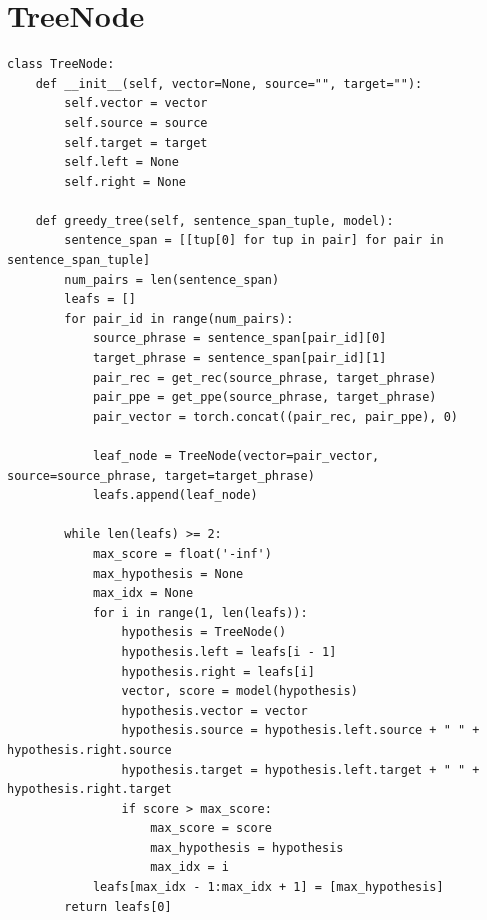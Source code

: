 \documentclass[12pt,a4paper,twoside,openright]{report}
\begin{document}
\section{TreeNode}
\begin{lstlisting}
class TreeNode:
    def __init__(self, vector=None, source="", target=""):
        self.vector = vector
        self.source = source
        self.target = target
        self.left = None
        self.right = None

    def greedy_tree(self, sentence_span_tuple, model):
        sentence_span = [[tup[0] for tup in pair] for pair in sentence_span_tuple]
        num_pairs = len(sentence_span)
        leafs = []
        for pair_id in range(num_pairs):
            source_phrase = sentence_span[pair_id][0]
            target_phrase = sentence_span[pair_id][1]
            pair_rec = get_rec(source_phrase, target_phrase)
            pair_ppe = get_ppe(source_phrase, target_phrase)
            pair_vector = torch.concat((pair_rec, pair_ppe), 0)

            leaf_node = TreeNode(vector=pair_vector, source=source_phrase, target=target_phrase)
            leafs.append(leaf_node)

        while len(leafs) >= 2:
            max_score = float('-inf')
            max_hypothesis = None
            max_idx = None
            for i in range(1, len(leafs)):
                hypothesis = TreeNode()
                hypothesis.left = leafs[i - 1]
                hypothesis.right = leafs[i]
                vector, score = model(hypothesis)
                hypothesis.vector = vector
                hypothesis.source = hypothesis.left.source + " " + hypothesis.right.source
                hypothesis.target = hypothesis.left.target + " " + hypothesis.right.target
                if score > max_score:
                    max_score = score
                    max_hypothesis = hypothesis
                    max_idx = i
            leafs[max_idx - 1:max_idx + 1] = [max_hypothesis]
        return leafs[0]
\end{lstlisting}
\end{document}
